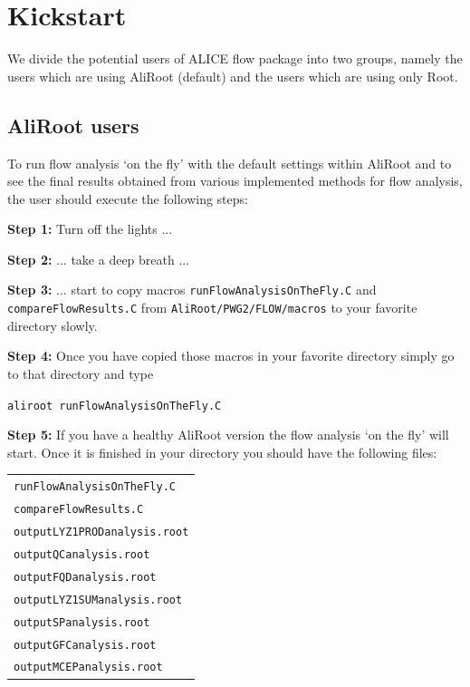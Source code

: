 \documentclass[a4paper]{book}
\numberwithin{equation}{subsection}
\begin{document}
\section{Kickstart}
\label{kickStart}
We divide the potential users of ALICE flow package into two groups, namely the users which are using AliRoot (default) and the users which are using only Root.   

\subsection{AliRoot users}
To run flow analysis `on the fly' with the default settings within AliRoot and to see the final results obtained from various implemented methods for flow analysis, the user should execute the following steps:
%
\begin{list}{}{}
\item \textbf{Step 1:} Turn off the lights ...
\item \textbf{Step 2:} ... take a deep breath ...
\item \textbf{Step 3:} ... start to copy macros 
\texttt{runFlowAnalysisOnTheFly.C} and \\ \texttt{compareFlowResults.C} from
\texttt{AliRoot/PWG2/FLOW/macros} to your favorite directory slowly. 
\item \textbf{Step 4:} Once you have copied those macros in your favorite directory simply go to that directory and type
%
\begin{center}
\texttt{aliroot runFlowAnalysisOnTheFly.C}
\end{center}
%
\item \textbf{Step 5:} If you have a healthy AliRoot version the flow analysis `on the fly' will start. Once it is finished in your directory you should have the following files: 
%
\begin{center}
\begin{tabular}[t]{l}
\texttt{runFlowAnalysisOnTheFly.C} \\ 
\texttt{compareFlowResults.C} \\ 
\texttt{outputLYZ1PRODanalysis.root} \\ 
\texttt{outputQCanalysis.root} \\
\texttt{outputFQDanalysis.root} \\ 
\texttt{outputLYZ1SUManalysis.root} \\ 
\texttt{outputSPanalysis.root} \\
\texttt{outputGFCanalysis.root} \\
\texttt{outputMCEPanalysis.root}

\end{tabular}
\end{center}
\end{list}
\end{document}
